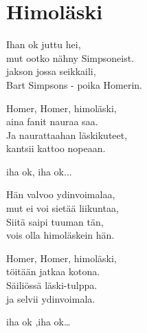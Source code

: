 \section{Himoläski}
Ihan ok juttu hei,\\
mut ootko nähny Simpsoneist.\\
jakson jossa seikkaili,\\
Bart Simpsons - poika Homerin.

Homer, Homer, himoläski,\\
aina fanit nauraa saa.\\
Ja naurattaahan läskikuteet,\\
kantsii kattoo nopeaan.

iha ok, iha ok...

Hän valvoo ydinvoimalaa,\\
mut ei voi sietää liikuntaa,\\
Siitä saipi tuuman tän,\\
vois olla himoläskein hän.

Homer, Homer, himoläski,\\
töitään jatkaa kotona.\\
Säiliössä läski-tulppa.\\
ja selvii ydinvoimala.

iha ok ,iha ok…